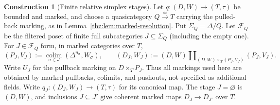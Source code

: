 \documentclass[oneside]{article}
\theoremstyle{plain}
\theoremstyle{definition}
\newtheorem{construction}[theorem]{Construction}
\theoremstyle{remark}
\begin{document}
\begin{construction}[Finite relative simplex stages]
\label{con:relative-simplex-stages}
Let $q:(D,W)\to(T,\tau)$ be bounded and marked, and choose a
quasicategory $Q\xrightarrow{\simeq}T$ carrying the pulled-back
marking, as in Lemma~\ref{thz:lem:marked-resolution}. Put
$\Sigma_Q=\Delta/Q$. Let $\mathcal F_Q$ be the filtered poset of
finite full subcategories $J\subseteq\Sigma_Q$ (including the empty
one). For $J\in\mathcal F_Q$ form, in marked categories over $T$,
\[
 (P_J,V_J):=\operatorname*{colim}_{\sigma\in J}
        (\Delta^{n_\sigma},W_\sigma),\qquad
 (D_J,W_J):=(D,W)\amalg_{(D,W)\times_T(P_J,V_J)}(P_J,V_J).
\]
Write $U_J$ for the pullback marking on $D\times_TP_J$.
Thus all markings used here are obtained by marked pullbacks,
colimits, and pushouts, not specified as additional fields.
Write $q_J:(D_J,W_J)\to(T,\tau)$ for its canonical map. The stage
$J=\varnothing$ is $(D,W)$, and inclusions $J\subseteq J'$ give
coherent marked maps $D_J\to D_{J'}$ over $T$.
\end{construction}
\end{document}

